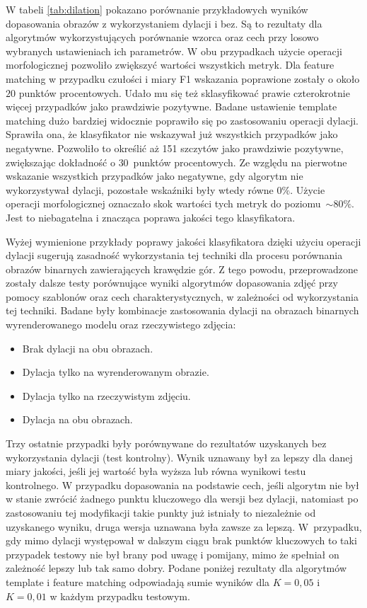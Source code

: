 W tabeli \ref{tab:dilation} pokazano porównanie przykładowych wyników dopasowania obrazów z wykorzystaniem dylacji i bez. Są to rezultaty dla algorytmów wykorzystujących porównanie wzorca oraz cech przy losowo wybranych ustawieniach ich parametrów. W obu przypadkach użycie operacji morfologicznej pozwoliło zwiększyć wartości wszystkich metryk. Dla feature matching w przypadku czułości i miary F1 wskazania poprawione zostały o około $20$ punktów procentowych. Udało mu się też sklasyfikować prawie czterokrotnie więcej przypadków jako prawdziwie pozytywne. Badane ustawienie template matching dużo bardziej widocznie poprawiło się po zastosowaniu operacji dylacji. Sprawiła ona, że klasyfikator nie wskazywał już wszystkich przypadków jako negatywne. Pozwoliło to określić aż 151 szczytów jako prawdziwie pozytywne, zwiększając dokładność o $30$~punktów procentowych. Ze względu na pierwotne wskazanie wszystkich przypadków jako negatywne, gdy algorytm nie wykorzystywał dylacji, pozostałe wskaźniki były wtedy równe $0\%$. Użycie operacji morfologicznej oznaczało skok wartości tych metryk do poziomu~$\sim80\%$. Jest to niebagatelna i znacząca poprawa jakości tego klasyfikatora.



Wyżej wymienione przykłady poprawy jakości klasyfikatora dzięki użyciu operacji dylacji sugerują zasadność wykorzystania tej techniki dla procesu porównania obrazów binarnych zawierających krawędzie gór. Z tego powodu, przeprowadzone zostały dalsze testy porównujące wyniki algorytmów dopasowania zdjęć przy pomocy szablonów oraz cech charakterystycznych, w zależności od wykorzystania tej techniki. Badane były kombinacje zastosowania dylacji na obrazach binarnych wyrenderowanego modelu oraz rzeczywistego zdjęcia:

\begin{itemize}
    \item Brak dylacji na obu obrazach.
    \item Dylacja tylko na wyrenderowanym obrazie.
    \item Dylacja tylko na rzeczywistym zdjęciu.
    \item Dylacja na obu obrazach.
\end{itemize}

Trzy ostatnie przypadki były porównywane do rezultatów uzyskanych bez wykorzystania dylacji (test kontrolny). Wynik uznawany był za lepszy dla danej miary jakości, jeśli jej wartość była wyższa lub równa wynikowi testu kontrolnego. W przypadku dopasowania na podstawie cech, jeśli algorytm nie był w stanie zwrócić żadnego punktu kluczowego dla wersji bez dylacji, natomiast po zastosowaniu tej modyfikacji takie punkty już istniały to niezależnie od uzyskanego wyniku, druga wersja uznawana była zawsze za lepszą. W~przypadku, gdy mimo dylacji występował w dalszym ciągu brak punktów kluczowych to taki przypadek testowy nie był brany pod uwagę i pomijany, mimo że spełniał on zależność lepszy lub tak samo dobry. Podane poniżej rezultaty dla algorytmów template i feature matching odpowiadają sumie wyników dla $K=0,05$ i $K=0,01$ w każdym przypadku testowym. 


